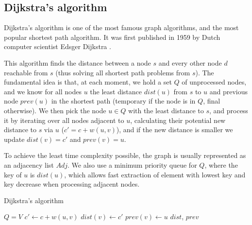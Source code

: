 \subsection{Dijkstra's algorithm} \label{algorithm-shortestpath-dijkstra}
Dijkstra's algorithm is one of the most famous graph algorithms, and the most popular shortest path algorithm. It was first published in 1959 by Dutch computer scientist Edsger Dijkstra \cite{dijkstra}.\par
This algorithm finds the distance between a node $s$ and every other node $d$ reachable from $s$ (thus solving all shortest path problems from $s$). The fundamental idea is that, at each moment, we hold a set $Q$ of unprocessed nodes, and we know for all nodes $u$ the least distance $dist(u)$ from $s$ to $u$ and previous node $prev(u)$ in the shortest path (temporary if the node is in $Q$, final otherwise). We then pick the node $u \in Q$ with the least distance to $s$, and process it by iterating over all nodes adjacent to $u$, calculating their potential new distance to $s$ via $u$ ($c'=c+w(u,v)$), and if the new distance is smaller we update $dist(v)=c'$ and $prev(v)=u$.\par
To achieve the least time complexity possible, the graph is usually represented as an adjacency list $Adj$. We also use a minimum priority queue for $Q$, where the key of $u$ is $dist(u)$, which allows fast extraction of element with lowest key and key decrease when processing adjacent nodes.
\begin{algorithm}[H]
    \caption{Dijkstra's algorithm}
    \label{alg-dijkstra}
    \begin{algorithmic}[1]
             
            \EndFor
            \State $Q = V$
             
                    \State $c' \gets c + w(u, v)$
                        \State $dist(v) \gets c'$
                        \State $prev(v) \gets u$
                    \EndIf
                \EndFor
            \EndWhile
            \State \Return $dist$, $prev$
        \EndFunction
    \end{algorithmic}
\end{algorithm}
